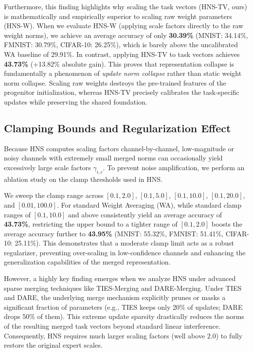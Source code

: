 \documentclass{article}
\theoremstyle{plain}
\theoremstyle{definition}
\theoremstyle{remark}
\begin{document}
Furthermore, this finding highlights why scaling the task vectors (HNS-TV, ours) is mathematically and empirically superior to scaling raw weight parameters (HNS-W). When we evaluate HNS-W (applying scale factors directly to the raw weight norms), we achieve an average accuracy of only \textbf{30.39\%} (MNIST: 34.14\%, FMNIST: 30.79\%, CIFAR-10: 26.25\%), which is barely above the uncalibrated WA baseline of 29.91\%. In contrast, applying HNS-TV to task vectors achieves \textbf{43.73\%} (+13.82\% absolute gain). This proves that representation collapse is fundamentally a phenomenon of \textit{update norm collapse} rather than static weight norm collapse. Scaling raw weights destroys the pre-trained features of the progenitor initialization, whereas HNS-TV precisely calibrates the task-specific updates while preserving the shared foundation.

\subsection{Clamping Bounds and Regularization Effect}
Because HNS computes scaling factors channel-by-channel, low-magnitude or noisy channels with extremely small merged norms can occasionally yield excessively large scale factors $\gamma_{i,c}$. To prevent noise amplification, we perform an ablation study on the clamp thresholds used in HNS. 

We sweep the clamp range across $[0.1, 2.0]$, $[0.1, 5.0]$, $[0.1, 10.0]$, $[0.1, 20.0]$, and $[0.01, 100.0]$. For standard Weight Averaging (WA), while standard clamp ranges of $[0.1, 10.0]$ and above consistently yield an average accuracy of \textbf{43.73\%}, restricting the upper bound to a tighter range of $[0.1, 2.0]$ boosts the average accuracy further to \textbf{43.95\%} (MNIST: 55.32\%, FMNIST: 51.41\%, CIFAR-10: 25.11\%). This demonstrates that a moderate clamp limit acts as a robust regularizer, preventing over-scaling in low-confidence channels and enhancing the generalization capabilities of the merged representation.

However, a highly key finding emerges when we analyze HNS under advanced sparse merging techniques like TIES-Merging and DARE-Merging. Under TIES and DARE, the underlying merge mechanism explicitly prunes or masks a significant fraction of parameters (e.g., TIES keeps only 20\% of updates; DARE drops 50\% of them). This extreme update sparsity drastically reduces the norms of the resulting merged task vectors beyond standard linear interference. Consequently, HNS requires much larger scaling factors (well above $2.0$) to fully restore the original expert scales.
\end{document}
